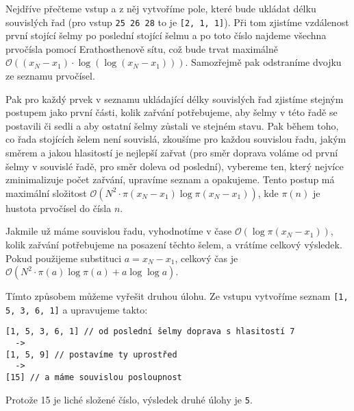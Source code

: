 \documentclass{fkssolpub}
\begin{document}
Nejdříve přečteme vstup a z něj vytvoříme pole, které
bude ukládat délku souvislých řad 
(pro vstup \verb|25 26 28| to je \verb|[2, 1, 1]|).
Při tom zjistíme vzdálenost první stojící šelmy po poslední
stojící šelmu a po toto číslo najdeme všechna prvočísla
pomocí Erathosthenově sítu, což bude trvat maximálně 
$\mathcal{O}((x_N - x_1) \cdot \log (\log (x_N - x_1)))$. 
Samozřejmě pak odstraníme dvojku ze seznamu prvočísel. 

Pak pro každý prvek v seznamu ukládající délky souvislých
řad zjistíme stejným postupem
jako první části, kolik zařvání potřebujeme, aby
šelmy v této řadě se postavili či sedli a aby ostatní
šelmy zůstali ve stejném stavu. Pak během toho, co řada
stojících šelem není souvislá, zkoušíme pro každou 
souvislou řadu, jakým směrem a jakou hlasitostí je
nejlepší zařvat (pro směr doprava voláme od první šelmy
v souvislé řadě, pro směr doleva od poslední), vybereme
ten, který nejvíce zminimalizuje počet zařvání, upravíme
seznam a opakujeme. Tento postup má maximální složitost
$\mathcal{O}(N^2 \cdot \pi(x_N - x_1) \log \pi(x_N - x_1))$,
kde $\pi(n)$ je hustota prvočísel do čísla $n$.

Jakmile už máme souvislou řadu, vyhodnotíme v čase
$\mathcal{O}(\log \pi(x_N - x_1))$, kolik zařvání
potřebujeme na posazení těchto šelem, a vrátíme
celkový výsledek. Pokud použijeme substituci
$a = x_N - x_1$, celkový čas je $\mathcal{O}(
N^2 \cdot \pi(a) \log \pi(a) + a \log \log a
)$.

Tímto způsobem můžeme vyřešit druhou úlohu. Ze vstupu
vytvoříme seznam \verb|[1, 5, 3, 6, 1]| a upravujeme
takto:

\begin{verbatim}
[1, 5, 3, 6, 1] // od poslední šelmy doprava s hlasitostí 7
  ->
[1, 5, 9] // postavíme ty uprostřed
  ->
[15] // a máme souvislou posloupnost
\end{verbatim}

Protože 15 je liché složené číslo, výsledek druhé úlohy
je \verb|5|.
\end{document}
